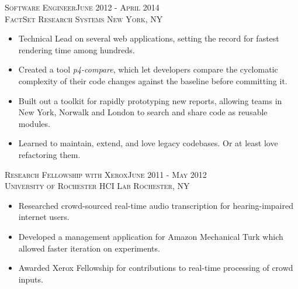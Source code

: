 \textsc{Software Engineer\hfill June 2012 - April 2014\\}
\textsc{FactSet Research Systems \hfill New York, NY\\}
\begin{itemize}
  \setlength{\itemsep}{1pt}
	\setlength{\parskip}{0pt}
	\setlength{\parsep}{0pt}
	\setlength{\leftmargin}{-5mm}
	\item Technical Lead on several web applications, setting the record for fastest rendering time among hundreds.
	\item Created a tool \textit{p4-compare}, which let developers compare the cyclomatic complexity of their code
	changes against the baseline before committing it.
	\item Built out a toolkit for rapidly prototyping new reports, allowing teams in New York, Norwalk and London to search and share code as reusable modules.
	\item Learned to maintain, extend, and love legacy codebases. Or at least love refactoring them.
\end{itemize}





\textsc{Research Fellowship with Xerox\hfill June 2011 - May 2012\\}
\textsc{University of Rochester HCI Lab \hfill Rochester, NY\\}
\begin{itemize}
  \setlength{\itemsep}{1pt}
  \setlength{\parskip}{0pt}
  \setlength{\parsep}{0pt}
  \setlength{\leftmargin}{-5mm}
      \item Researched crowd-sourced real-time audio transcription for hearing-impaired internet users.
      \item Developed a management application for Amazon Mechanical Turk which allowed faster iteration on experiments.
      \item Awarded Xerox Fellowship for contributions to real-time processing of crowd inputs.
\end{itemize}
